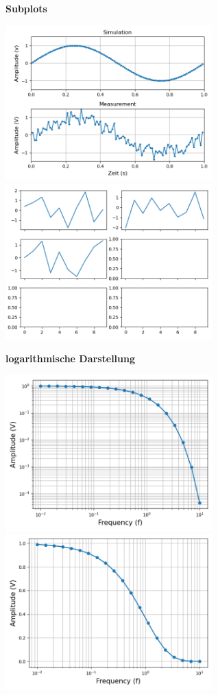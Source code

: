 \newpage
\textbf{Subplots}
\\
\begin{minipage}[h]{10cm}
	
\end{minipage}
\begin{minipage}[h]{8cm}
	\includegraphics[width=8cm,align=t]{pics/Matplotlib/Subplots.png}
	\includegraphics[width=8cm,align=t]{pics/Matplotlib/MultSubplots.png}
\end{minipage}
\newpage
\textbf{logarithmische Darstellung}
\\
\begin{minipage}[h]{10cm}
	
\end{minipage}
\begin{minipage}[h]{8cm}
	\includegraphics[width=8cm,align=t]{pics/Matplotlib/Loglog.png}
	\includegraphics[width=8cm,align=t]{pics/Matplotlib/Semilogx.png}
\end{minipage}
